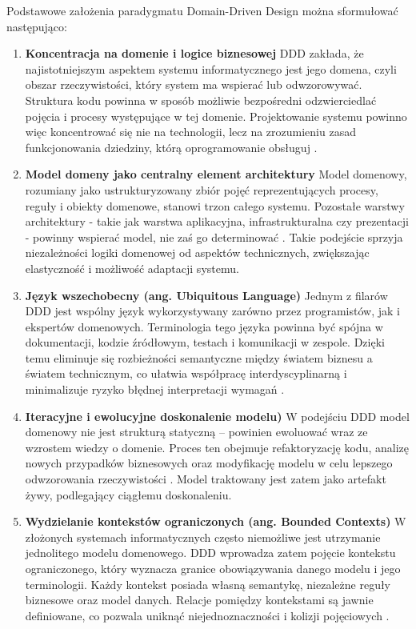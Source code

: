 Podstawowe założenia paradygmatu Domain-Driven Design można sformułować następująco:
\begin{enumerate}
    \item \textbf{Koncentracja na domenie i logice biznesowej} \newline
    DDD zakłada, że najistotniejszym aspektem systemu informatycznego jest jego domena, czyli obszar rzeczywistości, który system ma wspierać lub odwzorowywać. Struktura kodu powinna w sposób możliwie bezpośredni odzwierciedlać pojęcia i procesy występujące w tej domenie. Projektowanie systemu powinno więc koncentrować się nie na technologii, lecz na zrozumieniu zasad funkcjonowania dziedziny, którą oprogramowanie obsługuj \cite{evans2004ddd}.
    \item \textbf{Model domeny jako centralny element architektury} \newline
    Model domenowy, rozumiany jako ustrukturyzowany zbiór pojęć reprezentujących procesy, reguły i obiekty domenowe, stanowi trzon całego systemu. Pozostałe warstwy architektury - takie jak warstwa aplikacyjna, infrastrukturalna czy prezentacji - powinny wspierać model, nie zaś go determinować \cite{vernon2013ddd}. Takie podejście sprzyja niezależności logiki domenowej od aspektów technicznych, zwiększając elastyczność i możliwość adaptacji systemu.
    \item \textbf{Język wszechobecny (ang. Ubiquitous Language)} \newline
    Jednym z filarów DDD jest wspólny język wykorzystywany zarówno przez programistów, jak i ekspertów domenowych. Terminologia tego języka powinna być spójna w dokumentacji, kodzie źródłowym, testach i komunikacji w zespole. Dzięki temu eliminuje się rozbieżności semantyczne między światem biznesu a światem technicznym, co ułatwia współpracę interdyscyplinarną i minimalizuje ryzyko błędnej interpretacji wymagań \cite{vernon2013ddd}\cite{khononov2021ddd}.
    \item \textbf{Iteracyjne i ewolucyjne doskonalenie modelu)} \newline
    W podejściu DDD model domenowy nie jest strukturą statyczną – powinien ewoluować wraz ze wzrostem wiedzy o domenie. Proces ten obejmuje refaktoryzację kodu, analizę nowych przypadków biznesowych oraz modyfikację modelu w celu lepszego odwzorowania rzeczywistości \cite{khononov2021ddd}. Model traktowany jest zatem jako artefakt żywy, podlegający ciągłemu doskonaleniu.
    \item \textbf{Wydzielanie kontekstów ograniczonych (ang. Bounded Contexts)} \newline
    W złożonych systemach informatycznych często niemożliwe jest utrzymanie jednolitego modelu domenowego. DDD wprowadza zatem pojęcie kontekstu ograniczonego, który wyznacza granice obowiązywania danego modelu i jego terminologii. Każdy kontekst posiada własną semantykę, niezależne reguły biznesowe oraz model danych. Relacje pomiędzy kontekstami są jawnie definiowane, co pozwala uniknąć niejednoznaczności i kolizji pojęciowych \cite{vernon2013ddd} \cite{brandolini2019eventstorming}.
\end{enumerate}

